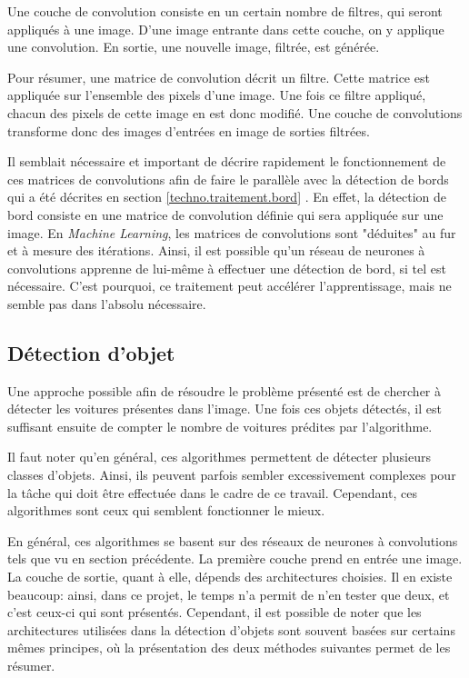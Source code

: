 Une couche de convolution consiste en un certain nombre de filtres, qui seront appliqués à une image. D'une image entrante dans cette couche, on y applique une convolution. En sortie, une nouvelle image, filtrée, est générée.

Pour résumer, une matrice de convolution décrit un filtre. Cette matrice est appliquée sur l'ensemble des pixels d'une image. Une fois ce filtre appliqué, chacun des pixels de cette image en est donc modifié. Une couche de convolutions transforme donc des images d'entrées en image de sorties filtrées.

Il semblait nécessaire et important de décrire rapidement le fonctionnement de ces matrices de convolutions afin de faire le parallèle avec la détection de bords qui a été décrites en section \ref{techno.traitement.bord} . En effet, la détection de bord consiste en une matrice de convolution définie qui sera appliquée sur une image. En \textit{Machine Learning}, les matrices de convolutions sont "déduites" au fur et à mesure des itérations. Ainsi, il est possible qu'un réseau de neurones à convolutions apprenne de lui-même à effectuer une détection de bord, si tel est nécessaire. C'est pourquoi, ce traitement peut accélérer l'apprentissage, mais ne semble pas dans l'absolu nécessaire.

\subsection{Détection d'objet}\label{techno.nn.object}

Une approche possible afin de résoudre le problème présenté est de chercher à détecter les voitures présentes dans l'image. Une fois ces objets détectés, il est suffisant ensuite de compter le nombre de voitures prédites par l'algorithme. 

Il faut noter qu'en général, ces algorithmes permettent de détecter plusieurs classes d'objets. Ainsi, ils peuvent parfois sembler excessivement complexes pour la tâche qui doit être effectuée dans le cadre de ce travail. Cependant, ces algorithmes sont ceux qui semblent fonctionner le mieux.

En général, ces algorithmes se basent sur des réseaux de neurones à convolutions tels que vu en section précédente. La première couche prend en entrée une image. La couche de sortie, quant à elle, dépends des architectures choisies. Il en existe beaucoup: ainsi, dans ce projet, le temps n'a permit de n'en tester que deux, et c'est ceux-ci qui sont présentés. Cependant, il est possible de noter que les architectures utilisées dans la détection d'objets sont souvent basées sur certains mêmes principes, où la présentation des deux méthodes suivantes permet de les résumer. 

